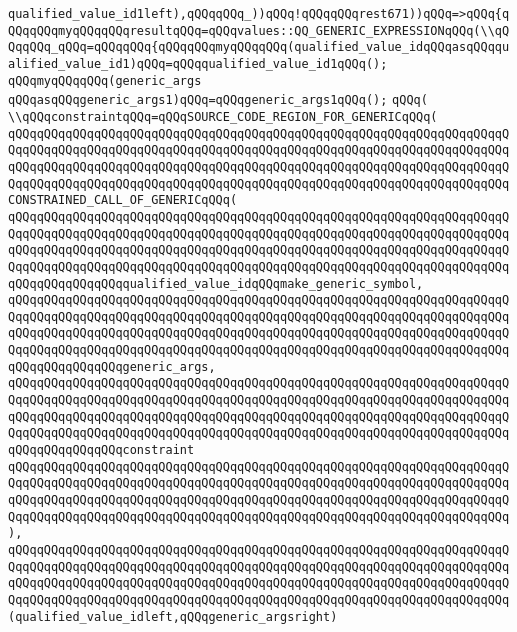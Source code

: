 \verb|qualified_value_id1left),qQQqqQQq_))qQQq!qQQqqQQqrest671))qQQq=>qQQq{qQQqqQQqmyqQQqqQQqresultqQQq=qQQqvalues::QQ_GENERIC_EXPRESSIONqQQq(\\qQQqqQQq_qQQq=qQQqqQQq{qQQqqQQqmyqQQqqQQq(qualified_value_idqQQqasqQQqqualified_value_id1)qQQq=qQQqqualified_value_id1qQQq();|\newline
\verb|qQQqmyqQQqqQQq(generic_args|\newline
\verb|qQQqasqQQqgeneric_args1)qQQq=qQQqgeneric_args1qQQq();|\newline
\verb|qQQq(|\newline
\verb|\\qQQqconstraintqQQq=qQQqSOURCE_CODE_REGION_FOR_GENERICqQQq(|\newline
\verb|qQQqqQQqqQQqqQQqqQQqqQQqqQQqqQQqqQQqqQQqqQQqqQQqqQQqqQQqqQQqqQQqqQQqqQQqqQQqqQQqqQQqqQQqqQQqqQQqqQQqqQQqqQQqqQQqqQQqqQQqqQQqqQQqqQQqqQQqqQQqqQQqqQQqqQQqqQQqqQQqqQQqqQQqqQQqqQQqqQQqqQQqqQQqqQQqqQQqqQQqqQQqqQQqqQQqqQQqqQQqqQQqqQQqqQQqqQQqqQQqqQQqqQQqqQQqqQQqqQQqqQQqqQQqqQQqqQQqqQQqCONSTRAINED_CALL_OF_GENERICqQQq(|\newline
\verb|qQQqqQQqqQQqqQQqqQQqqQQqqQQqqQQqqQQqqQQqqQQqqQQqqQQqqQQqqQQqqQQqqQQqqQQqqQQqqQQqqQQqqQQqqQQqqQQqqQQqqQQqqQQqqQQqqQQqqQQqqQQqqQQqqQQqqQQqqQQqqQQqqQQqqQQqqQQqqQQqqQQqqQQqqQQqqQQqqQQqqQQqqQQqqQQqqQQqqQQqqQQqqQQqqQQqqQQqqQQqqQQqqQQqqQQqqQQqqQQqqQQqqQQqqQQqqQQqqQQqqQQqqQQqqQQqqQQqqQQqqQQqqQQqqQQqqQQqqualified_value_idqQQqmake_generic_symbol,|\newline
\verb|qQQqqQQqqQQqqQQqqQQqqQQqqQQqqQQqqQQqqQQqqQQqqQQqqQQqqQQqqQQqqQQqqQQqqQQqqQQqqQQqqQQqqQQqqQQqqQQqqQQqqQQqqQQqqQQqqQQqqQQqqQQqqQQqqQQqqQQqqQQqqQQqqQQqqQQqqQQqqQQqqQQqqQQqqQQqqQQqqQQqqQQqqQQqqQQqqQQqqQQqqQQqqQQqqQQqqQQqqQQqqQQqqQQqqQQqqQQqqQQqqQQqqQQqqQQqqQQqqQQqqQQqqQQqqQQqqQQqqQQqqQQqqQQqqQQqqQQqgeneric_args,|\newline
\verb|qQQqqQQqqQQqqQQqqQQqqQQqqQQqqQQqqQQqqQQqqQQqqQQqqQQqqQQqqQQqqQQqqQQqqQQqqQQqqQQqqQQqqQQqqQQqqQQqqQQqqQQqqQQqqQQqqQQqqQQqqQQqqQQqqQQqqQQqqQQqqQQqqQQqqQQqqQQqqQQqqQQqqQQqqQQqqQQqqQQqqQQqqQQqqQQqqQQqqQQqqQQqqQQqqQQqqQQqqQQqqQQqqQQqqQQqqQQqqQQqqQQqqQQqqQQqqQQqqQQqqQQqqQQqqQQqqQQqqQQqqQQqqQQqqQQqqQQqconstraint|\newline
\verb|qQQqqQQqqQQqqQQqqQQqqQQqqQQqqQQqqQQqqQQqqQQqqQQqqQQqqQQqqQQqqQQqqQQqqQQqqQQqqQQqqQQqqQQqqQQqqQQqqQQqqQQqqQQqqQQqqQQqqQQqqQQqqQQqqQQqqQQqqQQqqQQqqQQqqQQqqQQqqQQqqQQqqQQqqQQqqQQqqQQqqQQqqQQqqQQqqQQqqQQqqQQqqQQqqQQqqQQqqQQqqQQqqQQqqQQqqQQqqQQqqQQqqQQqqQQqqQQqqQQqqQQqqQQqqQQqqQQqqQQq),|\newline
\verb|qQQqqQQqqQQqqQQqqQQqqQQqqQQqqQQqqQQqqQQqqQQqqQQqqQQqqQQqqQQqqQQqqQQqqQQqqQQqqQQqqQQqqQQqqQQqqQQqqQQqqQQqqQQqqQQqqQQqqQQqqQQqqQQqqQQqqQQqqQQqqQQqqQQqqQQqqQQqqQQqqQQqqQQqqQQqqQQqqQQqqQQqqQQqqQQqqQQqqQQqqQQqqQQqqQQqqQQqqQQqqQQqqQQqqQQqqQQqqQQqqQQqqQQqqQQqqQQqqQQqqQQqqQQqqQQqqQQqqQQq(qualified_value_idleft,qQQqgeneric_argsright)|\newline
